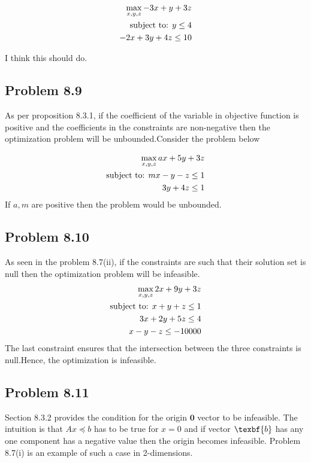 \documentclass[letterpaper,12pt]{article}
\theoremstyle{definition}
\begin{document}
\begin{align*}
  \max_{{x,y,z}} -3x+ y+ 3z\\
  \textnormal{subject to: } y\leq 4\\
   -2x + 3y+ 4z\leq 10\\
\end{align*}

I think this should do.

\subsection*{Problem 8.9 }

As per proposition 8.3.1, if the coefficient of the variable in objective function is positive and the coefficients in the constraints are non-negative then the optimization problem will be unbounded.Consider the problem below

\begin{align*}
  \max_{{x,y,z}} ax+ 5y+ 3z\\
  \textnormal{subject to: } mx -y-z\leq 1\\
   3y+4z\leq 1\\
\end{align*}
If $a,m$ are positive then the problem would be unbounded.
\subsection*{Problem 8.10 }
As seen in the problem 8.7(ii), if the constraints are such that their solution set is null then the optimization problem will be infeasible.
\begin{align*}
  \max_{{x,y,z}} 2x+ 9y+ 3z\\
  \textnormal{subject to: } x + y + z\leq 1\\
   3x + 2y+ 5z\leq 4 \\
   x - y- z\leq -10000
\end{align*}
The last constraint ensures that the intersection between the three constraints is null.Hence, the optimization is infeasible. 


\subsection*{Problem 8.11 }
Section 8.3.2 provides the condition for the origin $\textbf{0}$ vector to be infeasible. The intuition is that $Ax\preceq b$ has to be true for $x=0$ and if vector $\texbf{b}$ has any one component has a negative value then the origin becomes infeasible. Problem 8.7(i) is an example of such a case in 2-dimensions.
\end{document}
